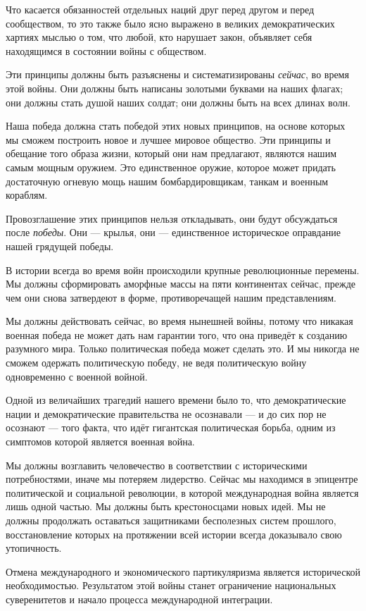 Что касается обязанностей отдельных наций друг перед другом и перед сообществом, то это также было ясно выражено в великих демократических хартиях мыслью о том, что любой, кто нарушает закон, объявляет себя находящимся в состоянии войны с обществом.

Эти принципы должны быть разъяснены и систематизированы \textit{сейчас}, во время этой войны. Они должны быть написаны золотыми буквами на наших флагах; они должны стать душой наших солдат; они должны быть на всех длинах волн.
 
Наша победа должна стать победой этих новых принципов, на основе которых мы сможем построить новое и лучшее мировое общество. Эти принципы и обещание того образа жизни, который они нам предлагают, являются нашим самым мощным оружием. Это единственное оружие, которое может придать достаточную огневую мощь нашим бомбардировщикам, танкам и военным кораблям.

Провозглашение этих принципов нельзя откладывать, они будут обсуждаться после \textit{победы}. Они — крылья, они — единственное историческое оправдание нашей грядущей победы.
 
В истории всегда во время войн происходили крупные революционные перемены. Мы должны сформировать аморфные массы на пяти континентах сейчас, прежде чем они снова затвердеют в форме, противоречащей нашим представлениям.

Мы должны действовать сейчас, во время нынешней войны, потому что никакая военная победа не может дать нам гарантии того, что она приведёт к созданию разумного мира. Только политическая победа может сделать это. И мы никогда не сможем одержать политическую победу, не ведя политическую войну одновременно с военной войной.
 
Одной из величайших трагедий нашего времени было то, что демократические нации и демократические правительства не осознавали — и до сих пор не осознают — того факта, что идёт гигантская политическая борьба, одним из симптомов которой является военная война.

Мы должны возглавить человечество в соответствии с историческими потребностями, иначе мы потеряем лидерство. Сейчас мы находимся в эпицентре политической и социальной революции, в которой международная война является лишь одной частью. Мы должны быть крестоносцами новых идей. Мы не должны продолжать оставаться защитниками бесполезных систем прошлого, восстановление которых на протяжении всей истории всегда доказывало свою утопичность.
 
Отмена международного и экономического партикуляризма является исторической необходимостью. Результатом этой войны станет ограничение национальных суверенитетов и начало процесса международной интеграции.

